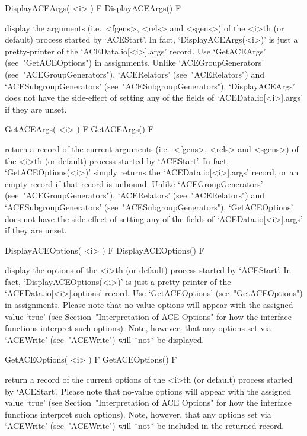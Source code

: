 \>DisplayACEArgs( <i> ) F
\>DisplayACEArgs() F

display the arguments (i.e.~<fgens>, <rels> and <sgens>) of the  <i>th
(or   default)   process   started    by    `ACEStart'.    In    fact,
`DisplayACEArgs(<i>)'   is    just    a    pretty-printer    of    the
`ACEData.io[<i>].args' record. Use `GetACEArgs'  (see~"GetACEOptions")
in          assignments.          Unlike          `ACEGroupGenerators'
(see~"ACEGroupGenerators"),  `ACERelators'   (see~"ACERelators")   and
`ACESubgroupGenerators'                 (see~"ACESubgroupGenerators"),
`DisplayACEArgs' does not have the side-effect of setting any  of  the
fields of `ACEData.io[<i>].args' if they are unset.

\>GetACEArgs( <i> ) F
\>GetACEArgs() F

return a record of the current  arguments  (i.e.~<fgens>,  <rels>  and
<sgens>) of the <i>th (or default) process started by  `ACEStart'.  In
fact, `GetACEOptions(<i>)' simply returns  the  `ACEData.io[<i>].args'
record,  or  an  empty  record  if  that  record  is  unbound.  Unlike
`ACEGroupGenerators'     (see~"ACEGroupGenerators"),     `ACERelators'
(see~"ACERelators")            and             `ACESubgroupGenerators'
(see~"ACESubgroupGenerators"),  `GetACEOptions'  does  not  have   the
side-effect of setting any of the fields of `ACEData.io[<i>].args'  if
they are unset.

\>DisplayACEOptions( <i> ) F
\>DisplayACEOptions() F

display the options of the  <i>th  (or  default)  process  started  by
`ACEStart'. In fact, `DisplayACEOptions(<i>)' is just a pretty-printer
of   the   `ACEData.io[<i>].options'   record.   Use   `GetACEOptions'
(see~"GetACEOptions") in assignments. Please note that no-value {\ACE}
options  will   appear   with   the   assigned   value   `true'   (see
Section~"Interpretation of ACE Options" for how the  {\ACE}  interface
functions interpret such options). Note, however, that any options set
via `ACEWrite' (see~"ACEWrite") will *not* be displayed.

\>GetACEOptions( <i> ) F
\>GetACEOptions() F

return a record of the current  options  of  the  <i>th  (or  default)
process started  by  `ACEStart'.  Please  note  that  no-value  {\ACE}
options  will   appear   with   the   assigned   value   `true'   (see
Section~"Interpretation of ACE Options" for how the  {\ACE}  interface
functions interpret such options). Note, however, that any options set
via `ACEWrite' (see~"ACEWrite") will *not* be included in the returned
record.

